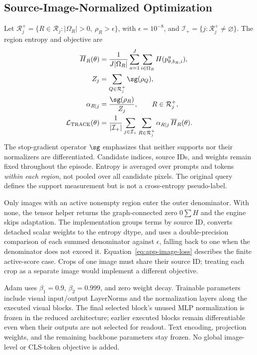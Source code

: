 \subsection{Source-Image-Normalized Optimization}
Let $\mathcal R_j^+=\{R\in\mathcal R_j:|\Omega_R|>0,\ \rho_R>\epsilon\}$, with $\epsilon=10^{-8}$, and $\mathcal I_+=\{j:\mathcal R_j^+\ne\varnothing\}$. The region entropy and objective are
\begin{align}
\overline H_R(\theta)&=\frac{1}{J|\Omega_R|}
 \sum_{a=1}^J\sum_{i\in\Omega_R}H(p^a_{\theta,b_R,i}),\\
Z_j&=\sum_{Q\in\mathcal R_j^+}\sg(\rho_Q),\\
\alpha_{R\mid j}&=\frac{\sg(\rho_R)}{Z_j},\qquad R\in\mathcal R_j^+,\\
\mathcal L_{\mathrm{TRACE}}(\theta)
 &=\frac1{|\mathcal I_+|}\sum_{j\in\mathcal I_+}
 \sum_{R\in\mathcal R_j^+}\alpha_{R\mid j}\,\overline H_R(\theta).
\label{eq:app-image-loss}
\end{align}
The stop-gradient operator $\sg$ emphasizes that neither supports nor their normalizers are differentiated. Candidate indices, source IDs, and weights remain fixed throughout the episode. Entropy is averaged over prompts and tokens \emph{within each region}, not pooled over all candidate pixels. The original query defines the support measurement but is not a cross-entropy pseudo-label.

Only images with an active nonempty region enter the outer denominator. With none, the tensor helper returns the graph-connected zero $0\sum H$ and the engine skips adaptation. The implementation groups terms by source ID, converts detached scalar weights to the entropy dtype, and uses a double-precision comparison of each summed denominator against $\epsilon$, falling back to one when the denominator does not exceed it. Equation~\ref{eq:app-image-loss} describes the finite active-score case. Crops of one image must share their source ID; treating each crop as a separate image would implement a different objective.

Adam uses $\beta_1=0.9$, $\beta_2=0.999$, and zero weight decay. Trainable parameters include visual input/output LayerNorms and the normalization layers along the executed visual blocks. The final selected block's unused MLP normalization is frozen in the reduced architecture; earlier executed blocks remain differentiable even when their outputs are not selected for readout. Text encoding, projection weights, and the remaining backbone parameters stay frozen. No global image-level or CLS-token objective is added.

